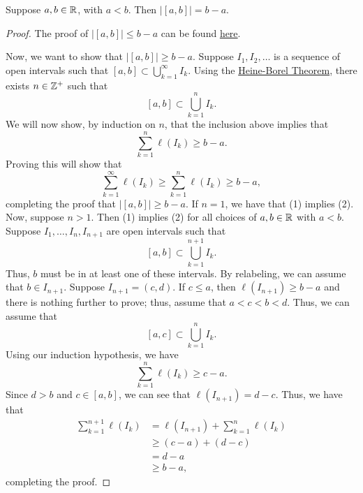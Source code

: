\documentclass[11pt,a4paper]{book}
\begin{document}
\begin{prop}
    Suppose \( a,b \in \mathbb{R}  \), with \( a < b  \). Then \( | [a,b] | = b - a  \). 
\end{prop}
\begin{proof}
The proof of \( | [a,b] | \leq b - a  \) can be found {\hyperref[proof of prop 1.1.6]{here}}.

Now, we want to show that \( | [a,b] | \geq b - a  \). Suppose \( {I}_{1}, {I}_{2}, \dots  \) is a sequence of open intervals such that \( [a,b] \subset \bigcup_{ k=1  }^{ \infty  }  {I}_{k }  \). Using the {\hyperref[Heine-Borel Theorem]{Heine-Borel Theorem}}, there exists \( n \in \mathbb{Z}^{+} \) such that  
\[  [a,b] \subset \bigcup_{ k=1  }^{ n  }  {I}_{k }. \]
We will now show, by induction on \( n  \), that the inclusion above implies that
\[  \sum_{ k=1  }^{ n } \ell({I}_{k }) \geq b - a. \tag{1} \]
Proving this will show that 
\[  \sum_{ k=1  }^{ \infty  } \ell({I}_{k }) \geq \sum_{ k=1  }^{ n } \ell({I}_{k }) \geq b - a, \tag{2}  \]
completing the proof that \( | [a,b] |  \geq b - a  \). If \( n = 1  \), we have that (1) implies (2). Now, suppose \(  n > 1  \). Then (1) implies (2) for all choices of \( a,b \in \mathbb{R}  \) with \( a  < b  \). Suppose \( {I}_{1}, \dots, {I}_{n}, {I}_{n+1} \) are open intervals such that 
\[  [a,b] \subset \bigcup_{ k=1  }^{ n+1 }  {I}_{k }.  \]
Thus, \( b  \) must be in at least one of these intervals. By relabeling, we can assume that \( b \in {I}_{n+1} \). Suppose \( {I}_{n+1} = (c,d) \). If \(  c \leq a  \), then \( \ell({I}_{n+1}) \geq b - a  \) and there is nothing further to prove; thus, assume that \( a < c < b < d  \). Thus, we can assume that   
\[  [a,c] \subset \bigcup_{ k=1  }^{ n }  {I}_{k }. \]
Using our induction hypothesis, we have
\[  \sum_{ k=1  }^{ n } \ell({I}_{k }) \geq c - a. \]
Since \( d > b  \) and \( c \in [a,b] \), we can see that \( \ell( {I}_{n+1}) = d - c  \).  Thus, we have that 
\begin{align*}
    \sum_{ k=1  }^{ n + 1 } \ell({I}_{k })  &= \ell({I}_{n+1}) +  \sum_{ k=1  }^{ n  } \ell({I}_{k})  \\
                                            &\geq  (c - a) + (d - c) \\
                                            &= d - a  \\
                                            &\geq b - a,
\end{align*}
completing the proof.
\end{proof}
\end{document}

